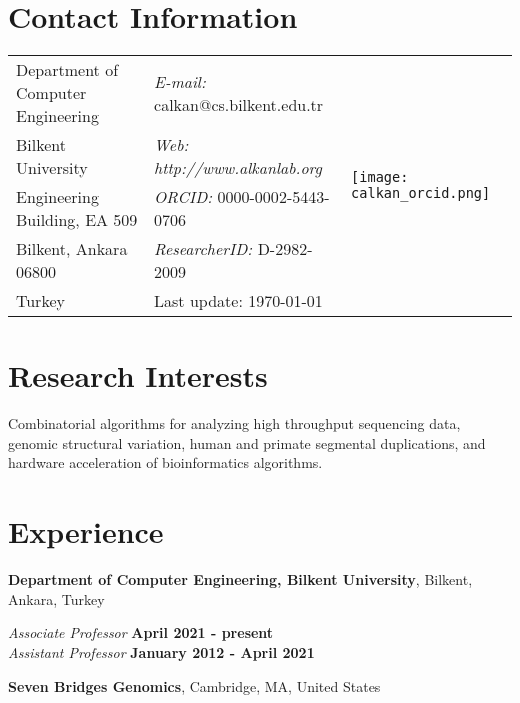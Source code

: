 \documentclass[margin,line]{res}
\begin{document}

\begin{resume}

\section{\sc Contact Information}
  
\vspace{.05in}
  
    \begin{tabular}{@{}p{2.5in}p{2.3in}p{1in}}
        Department of Computer Engineering & {\it E-mail:}  calkan@cs.bilkent.edu.tr  & \multirow{5}{*}{\texttt{[image: calkan\_orcid.png]}}\\            
        Bilkent University   &  {\it Web: http://www.alkanlab.org} & \\         
        Engineering Building, EA 509   & {\it ORCID: } 0000-0002-5443-0706 &\\        
        Bilkent, Ankara 06800 & {\it ResearcherID: } D-2982-2009 &\\ 
        Turkey & Last update: \today &\\ 
    \end{tabular}

  
\section{\sc Research Interests}
    Combinatorial algorithms for analyzing high throughput sequencing data, 
    genomic structural variation,  human and primate
    segmental duplications, and hardware acceleration of bioinformatics algorithms. 

\section{\sc Experience}
    {\bf Department of Computer Engineering, Bilkent University}, Bilkent, Ankara, Turkey
                 
    \vspace{-.3cm}
        {\em Associate Professor} \hfill {\bf April 2021 - present}\\ 
        {\em Assistant Professor} \hfill {\bf January 2012 - April 2021} 
            
    {\bf Seven Bridges Genomics}, Cambridge, MA, United States                
          

\end{resume}
\end{document}
